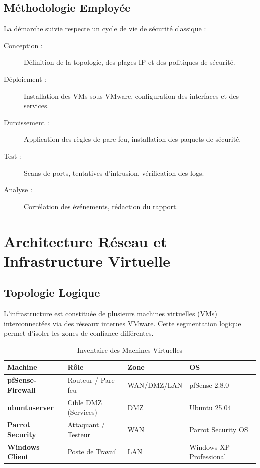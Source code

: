 \documentclass[12pt,a4paper,openany]{report}
\newcommand{\tableheadcolor}{\rowcolor{tableheadbg}}
\begin{document}
	\section{Méthodologie Employée}
	La démarche suivie respecte un cycle de vie de sécurité classique :
	\begin{description}
		\item[Conception :] Définition de la topologie, des plages IP et des politiques de sécurité.
		\item[Déploiement :] Installation des VMs sous VMware, configuration des interfaces et des services.
		\item[Durcissement :] Application des règles de pare-feu, installation des paquets de sécurité.
		\item[Test :] Scans de ports, tentatives d'intrusion, vérification des logs.
		\item[Analyse :] Corrélation des événements, rédaction du rapport.
	\end{description}
	
	\chapter{Architecture Réseau et Infrastructure Virtuelle}
	
	\section{Topologie Logique}
	L'infrastructure est constituée de plusieurs machines virtuelles (VMs) interconnectées via des réseaux internes VMware. Cette segmentation logique permet d'isoler les zones de confiance différentes.
	
	\begin{table}[ht]
		\centering
		\renewcommand{\arraystretch}{1.4}
		\setlength{\arrayrulewidth}{0.5pt}
		\begin{tabular}{>{\bfseries}p{3.5cm} p{3.2cm} p{2.8cm} p{3.2cm}}
			\arrayrulecolor{tableborder}
			\hline
			\tableheadcolor
			\textcolor{tableheadfg}{\textbf{Machine}} &
			\textcolor{tableheadfg}{\textbf{Rôle}} &
			\textcolor{tableheadfg}{\textbf{Zone}} &
			\textcolor{tableheadfg}{\textbf{OS}} \\
			\hline
			\rowcolor{tablerowalt}
			pfSense-Firewall & Routeur / Pare-feu & WAN/DMZ/LAN & pfSense 2.8.0 \\
			ubuntuserver & Cible DMZ (Services) & DMZ & Ubuntu 25.04 \\
			\rowcolor{tablerowalt}
			Parrot Security & Attaquant / Testeur & WAN & Parrot Security OS \\
			Windows Client & Poste de Travail & LAN & Windows XP Professional \\
			\hline
		\end{tabular}
		\caption{Inventaire des Machines Virtuelles}
		\label{tab:vm-inventory}
	\end{table}
	
\end{document}
